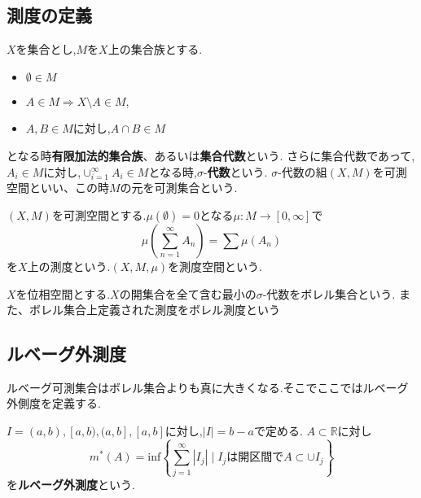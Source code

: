 \subsection{測度の定義}

\begin{screen}
\begin{dfn}
$X$を集合とし,$M$を$X$上の集合族とする.
\begin{itemize}
   \item $\emptyset \in M$
   \item $A \in M \Rightarrow X \setminus A \in M$,
   \item $A,B \in M$に対し,$A \cap B \in M$
\end{itemize}
となる時\textbf{有限加法的集合族}、あるいは\textbf{集合代数}という.
さらに集合代数であって,$A_i \in M$に対し,$\cup_{i=1}^{\infty} A_i \in M$となる時,$\sigma$-\textbf{代数}という.
$\sigma$-代数の組$(X, M)$を可測空間といい、この時$M$の元を可測集合という.
\end{dfn}
\end{screen}

\begin{screen}
\begin{dfn}
 $(X, M)$を可測空間とする.$\mu(\emptyset)=0$となる$\mu: M \to [0, \infty]$で
 \begin{equation*}
  \mu(\sum_{n=1}^{\infty} A_n )=\sum \mu(A_n)
\end{equation*}
を$X$上の測度という.$(X, M ,\mu)$を測度空間という.
\end{dfn}
\end{screen}

\begin{screen}
\begin{dfn}
  $X$を位相空間とする.$X$の開集合を全て含む最小の$\sigma$-代数をボレル集合という.
  また、ボレル集合上定義された測度をボレル測度という
\end{dfn}
\end{screen}

\subsection{ルベーグ外測度}
ルベーグ可測集合はボレル集合よりも真に大きくなる.そこでここではルベーグ外側度を定義する.

\begin{screen}
\begin{dfn}
  $I=(a,b),[a, b),(a,b],[a,b]$に対し,$|I|=b-a$で定める.
  $A \subset \mathbb{R}$に対し
  \begin{equation*}
   m^*(A)= \mathrm{inf} \left\{  \sum_{j=1}^{\infty} |I_j| \mid I_j \mbox{は開区間で} A \subset \cup I_j \right\}
  \end{equation*}
  を\textbf{ルベーグ外測度}という.
\end{dfn}
\end{screen}

